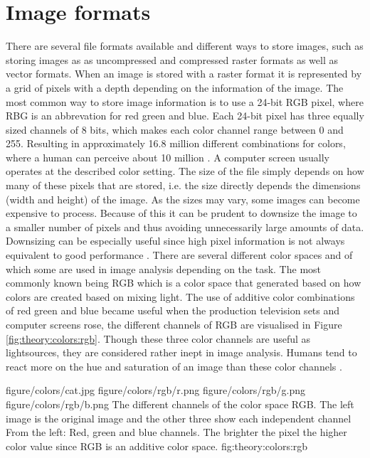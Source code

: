 \section{Image formats}
\label{sec:theory:image_formats}
There are several file formats available and different ways to store images, such as storing images as as uncompressed and compressed raster formats as well as vector formats. When an image is stored with a raster format it is represented by a grid of pixels with a depth depending on the information of the image. The most common way to store image information is to use a 24-bit RGB pixel, where RBG is an abbrevation for red green and blue. Each 24-bit pixel has three equally sized channels of 8 bits, which makes each color channel range between 0 and 255. Resulting in approximately 16.8 million different combinations for colors, where a human can perceive about 10 million \cite[p.388]{judd1975color}. A computer screen usually operates at the described color setting. The size of the file simply depends on how many of these pixels that are stored, i.e. the size directly depends the dimensions (width and height) of the image. As the sizes may vary, some images can become expensive to process. Because of this it can be prudent to downsize the image to a smaller number of pixels and thus avoiding unnecessarily large amounts of data. Downsizing can be especially useful since high pixel information is not always equivalent to good performance \cite{torralba200880}.
There are several different color spaces and of which some are used in image analysis depending on the task. The most commonly known being RGB which is a color space that generated based on how colors are created based on mixing light. The use of additive color combinations of red green and blue became useful when the production television sets and computer screens rose, the different channels of RGB are visualised in Figure \ref{fig:theory:colors:rgb}. Though these three color channels are useful as lightsources, they are considered rather inept in image analysis. Humans tend to react more on the hue and saturation of an image than these color channels \cite{alzu2015semantic}\cite{cheng2001color}. 


\fourfigure
{figure/colors/cat.jpg}
{figure/colors/rgb/r.png}
{figure/colors/rgb/g.png}
{figure/colors/rgb/b.png}
{The different channels of the color space RGB. The left image is the original image and the other three show each independent channel From the left: Red, green and blue channels. The brighter the pixel the higher color value since RGB is an additive color space.}
{fig:theory:colors:rgb} 

